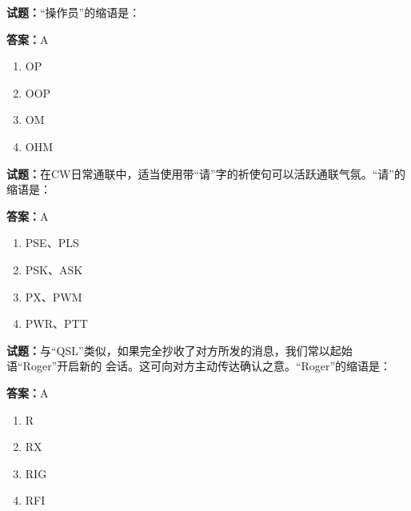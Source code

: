 \documentclass{ctexbook}
\begin{document}




\vspace{1em}

\textbf{试题：}“操作员”的缩语是： 

\textbf{答案：}A 

\begin{enumerate}[leftmargin=3em]
  \item OP 

  \item OOP 

  \item OM 

  \item OHM 

\end{enumerate}





\vspace{1em}

\textbf{试题：}在CW日常通联中，适当使用带“请”字的祈使句可以活跃通联气氛。“请”的缩语是： 

\textbf{答案：}A 

\begin{enumerate}[leftmargin=3em]
  \item PSE、PLS 

  \item PSK、ASK 

  \item PX、PWM 

  \item PWR、PTT 

\end{enumerate}





\vspace{1em}

\textbf{试题：}与“QSL”类似，如果完全抄收了对方所发的消息，我们常以起始语“Roger”开启新的
会话。这可向对方主动传达确认之意。“Roger”的缩语是： 

\textbf{答案：}A 

\begin{enumerate}[leftmargin=3em]
  \item R 

  \item RX 

  \item RIG 

  \item RFI 

\end{enumerate}
\end{document}

